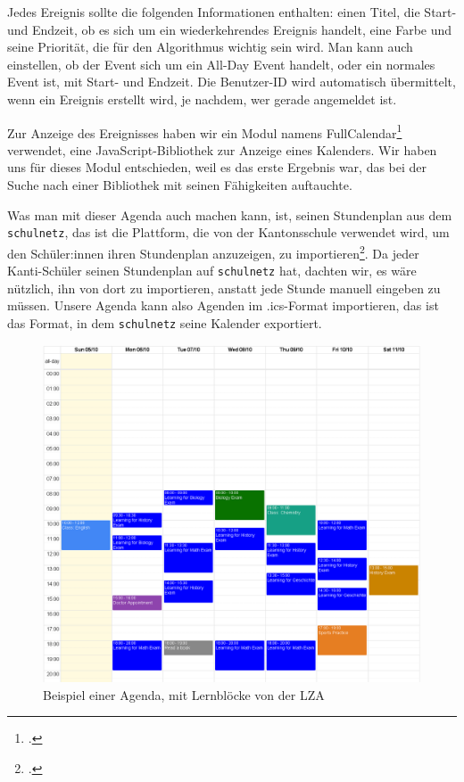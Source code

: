 \documentclass[12pt,a4paper]{report}
\begin{document}
Jedes Ereignis sollte die folgenden Informationen enthalten: einen Titel, die Start- und Endzeit, ob es sich um ein wiederkehrendes Ereignis handelt, eine Farbe und seine Priorität, die für den Algorithmus wichtig sein wird. Man kann auch einstellen, ob der Event sich um ein All-Day Event handelt, oder ein normales Event ist, mit Start- und Endzeit. Die Benutzer-ID wird automatisch übermittelt, wenn ein Ereignis erstellt wird, je nachdem, wer gerade angemeldet ist.

Zur Anzeige des Ereignisses haben wir ein Modul namens FullCalendar\footcite{full_calendar} verwendet, eine JavaScript-Bibliothek zur Anzeige eines Kalenders. Wir haben uns für dieses Modul entschieden, weil es das erste Ergebnis war, das bei der Suche nach einer Bibliothek mit seinen Fähigkeiten auftauchte. 

Was man mit dieser Agenda auch machen kann, ist, seinen Stundenplan aus dem \texttt{schulnetz}, das ist die Plattform, die von der Kantonsschule verwendet wird, um den Schüler:innen ihren Stundenplan anzuzeigen, zu importieren\footcite{icalendar}. Da jeder Kanti-Schüler seinen Stundenplan auf \texttt{schulnetz} hat, dachten wir, es wäre nützlich, ihn von dort zu importieren, anstatt jede Stunde manuell eingeben zu müssen. Unsere Agenda kann also Agenden im .ics-Format importieren, das ist das Format, in dem \texttt{schulnetz} seine Kalender exportiert.

\begin{figure}
    \centering
    \includegraphics[width=\linewidth]{img/agenda.png}
    \caption{Beispiel einer Agenda, mit Lernblöcke von der LZA}
    \label{fig:placeholder}
\end{figure}
\end{document}
